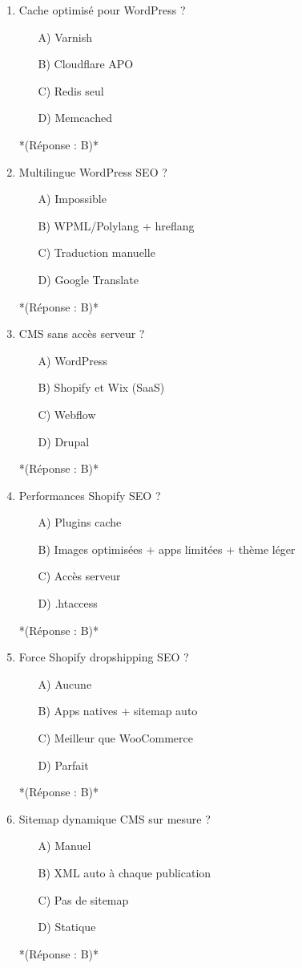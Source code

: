 \documentclass[12pt,a4paper,twoside]{report}
\begin{document}
\begin{enumerate}
\item Cache optimisé pour WordPress ?
\begin{itemize}
\item[A)] Varnish
\item[B)] Cloudflare APO
\item[C)] Redis seul
\item[D)] Memcached
\end{itemize}
*(Réponse : B)*

\item Multilingue WordPress SEO ?
\begin{itemize}
\item[A)] Impossible
\item[B)] WPML/Polylang + hreflang
\item[C)] Traduction manuelle
\item[D)] Google Translate
\end{itemize}
*(Réponse : B)*

\item CMS sans accès serveur ?
\begin{itemize}
\item[A)] WordPress
\item[B)] Shopify et Wix (SaaS)
\item[C)] Webflow
\item[D)] Drupal
\end{itemize}
*(Réponse : B)*

\item Performances Shopify SEO ?
\begin{itemize}
\item[A)] Plugins cache
\item[B)] Images optimisées + apps limitées + thème léger
\item[C)] Accès serveur
\item[D)] .htaccess
\end{itemize}
*(Réponse : B)*

\item Force Shopify dropshipping SEO ?
\begin{itemize}
\item[A)] Aucune
\item[B)] Apps natives + sitemap auto
\item[C)] Meilleur que WooCommerce
\item[D)] Parfait
\end{itemize}
*(Réponse : B)*

\item Sitemap dynamique CMS sur mesure ?
\begin{itemize}
\item[A)] Manuel
\item[B)] XML auto à chaque publication
\item[C)] Pas de sitemap
\item[D)] Statique
\end{itemize}
*(Réponse : B)*


\end{enumerate}
\end{document}
